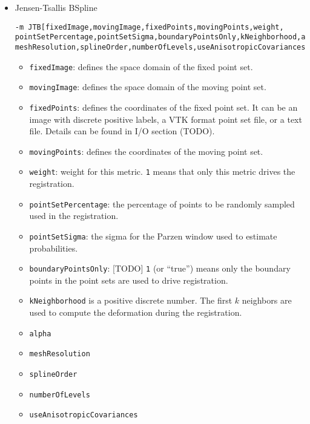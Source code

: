 \begin{itemize}
    \item Jensen-Tsallis BSpline
    \begin{verbatim}
-m JTB[fixedImage,movingImage,fixedPoints,movingPoints,weight,
pointSetPercentage,pointSetSigma,boundaryPointsOnly,kNeighborhood,alpha,
meshResolution,splineOrder,numberOfLevels,useAnisotropicCovariances] 
    \end{verbatim}
    \begin{itemize}
        \item \verb"fixedImage": defines the space domain of the fixed point set.
        \item \verb"movingImage": defines the space domain of the moving point set.
        \item \verb"fixedPoints": defines the coordinates of the fixed point set. It can be an image with discrete positive labels, a VTK format point set file, or a text file. Details can be found in I/O section (TODO).
        \item \verb"movingPoints": defines the coordinates of the moving point set.
        \item \verb"weight": weight for this metric. \verb"1" means that only this metric drives the registration.
        \item \verb"pointSetPercentage": the percentage of points to be randomly sampled used in the registration.
        \item \verb"pointSetSigma": the sigma for the Parzen window used to estimate probabilities.  
        \item \verb"boundaryPointsOnly": [TODO] \verb"1" (or ``true'') means only the boundary points in the point sets are used to drive registration.
        \item \verb"kNeighborhood" is a positive discrete number. The first $k$ neighbors are used to compute the deformation during the registration. 
        \item \verb"alpha"
        \item \verb"meshResolution"
        \item \verb"splineOrder"
        \item \verb"numberOfLevels"
        \item \verb"useAnisotropicCovariances"
    \end{itemize}

\end{itemize}

